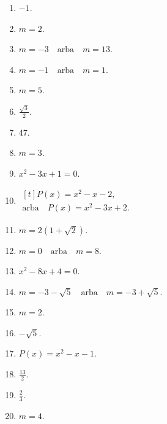\documentclass[11pt,a4paper]{article}
\begin{document}
\begin{enumerate}
\item \(-1\).
\item \(m=2\).
\item \(m=-3\quad\text{arba}\quad m=13\).
\item \(m=-1\quad\text{arba}\quad m=1\).
\item \(m=5\).
\item \(\frac{\sqrt{3}}{2}\).
\item \(47\).
\item \(m=3\).
\item \(x^{2}-3x+1=0\).
\item \(\begin{aligned}[t]P(x)=x^{2}-x-2,\\\text{arba}\quad P(x)=x^{2}-3x+2.\end{aligned}\)
\item \(m=2 \left(1 + \sqrt{2}\right)\).
\item \(m=0\quad\text{arba}\quad m=8\).
\item \(x^{2}-8x+4=0\).
\item \(m=-3 - \sqrt{5}\quad\text{arba}\quad m=-3 + \sqrt{5}\).
\item \(m=2\).
\item \(- \sqrt{5}\).
\item \(P(x)=x^{2}-x-1\).
\item \(\frac{13}{2}\).
\item \(\frac{2}{3}\).
\item \(m=4\).
\end{enumerate}
\endgroup
\end{document}
